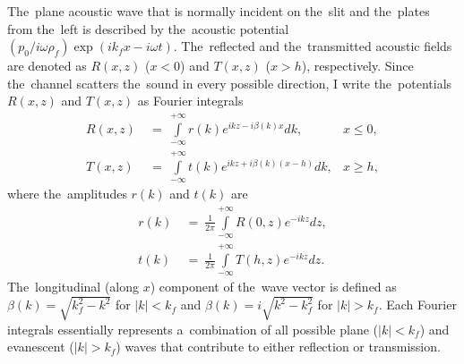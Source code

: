 The~plane acoustic wave that is normally incident on the~slit and the~plates from the~left is described by the~acoustic potential $(p_0/i \omega \rho_f) \exp(ik_fx-i\omega t)$.
The~reflected and the~transmitted acoustic fields are denoted as $R(x,z)$ ($x<0$) and $T(x,z)$ ($x>h$), respectively.
Since the~channel scatters the~sound in every possible direction, I write the~potentials $R(x,z)$ and $T(x,z)$ as Fourier integrals
\begin{align}
R(x,z)~&=~\int\limits_{-\infty}^{+\infty}r(k)e^{ikz-i\beta(\!k)x}dk, &x \leq 0, \label{refl}\\
T(x,z)~&=~\int\limits_{-\infty}^{+\infty}t(k)e^{ikz+i\beta(\!k)(x-h)}dk , &x \geq h, \label{transm}
\end{align}
where the~amplitudes $r(k)$ and $t(k)$ are
\begin{align}
r(k)~&=~\frac{1}{2\pi}\int\limits_{-\infty}^{+\infty}R(0,z)e^{-ikz}dz, \label{refl2}\\
t(k)~&=~\frac{1}{2\pi}\int\limits_{-\infty}^{+\infty}T(h,z)e^{-ikz}dz. \label{transm2}
\end{align}
The~longitudinal (along $x$) component of the~wave vector is defined as $\beta(k)=\sqrt{k_f^2-k^2}$ for $|k| < k_f$ and $\beta(k)=i\sqrt{k^2-k_f^2}$ for $|k| > k_f$.
Each Fourier integrals essentially represents a~combination of all possible plane ($|k| < k_f$) and evanescent ($|k| > k_f$) waves that contribute to either reflection or transmission.



